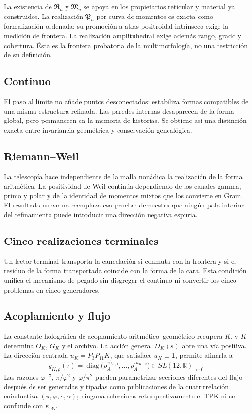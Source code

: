 La existencia de \(\mathfrak R_n\) y \(\mathfrak M_n\) se apoya en los
propietarios reticular y material ya construidos. La realización
\(\mathfrak P_n\) por curva de momentos es exacta como formalización ordenada;
su promoción a atlas positroidal intrínseco exige la medición de frontera. La
realización amplituhedral exige además rango, grado y cobertura. Ésta es la
frontera probatoria de la multimorfología, no una restricción de su definición.

\subsection{Continuo}

El paso al límite no añade puntos desconectados: estabiliza formas compatibles
de una misma estructura refinada. Las paredes internas desaparecen de la forma
global, pero permanecen en la memoria de historias. Se obtiene así una
distinción exacta entre invariancia geométrica y conservación genealógica.

\subsection{Riemann--Weil}

La telescopía hace independiente de la malla nonádica la realización de la
forma aritmética. La positividad de Weil continúa dependiendo de los canales
gamma, primo y polar y de la identidad de momentos mixtos que los convierte en
Gram. El resultado nuevo no reemplaza esa prueba: demuestra que ningún polo
interior del refinamiento puede introducir una dirección negativa espuria.

\subsection{Cinco realizaciones terminales}

Un lector terminal transporta la cancelación si conmuta con la frontera y si
el residuo de la forma transportada coincide con la forma de la cara. Esta
condición unifica el mecanismo de pegado sin disgregar el continuo ni convertir
los cinco problemas en cinco generadores.

\subsection{Acoplamiento y flujo}

La constante holográfica de acoplamiento aritmético--geométrico recupera
\(K\), y \(K\) determina \(O_K\), \(G_K\) y el archivo. La acción general
\(D_K(s)\) abre una vía positiva. La dirección centrada
\(u_K=P_3P_{11}K\), que satisface \(u_K\perp\mathbf1\), permite afinarla a
\[
g_{K,\rho}(\tau)=
\operatorname{diag}
\bigl(\rho_A^{\tau\widehat u_{K,1}},\ldots,
\rho_A^{\tau\widehat u_{K,12}}\bigr)\in SL(12,\mathbb R)_{>0}.
\]
Las razones
\(\varphi^{-2}\), \(\pi/\varphi^2\) y \(\varphi/\pi^2\) pueden parametrizar
secciones diferentes del flujo después de ser generadas y tipadas como
publicaciones de la cuatrirrelación coinductiva
\((\pi,\varphi,e,\alpha)\); ninguna selecciona retrospectivamente el TPK ni se
confunde con \(\kappa_{\rm ag}\).


